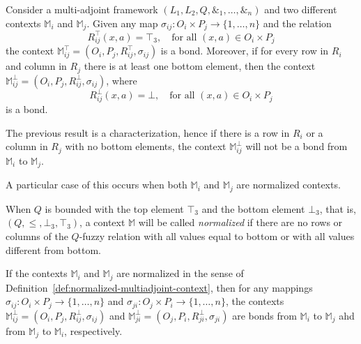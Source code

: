 \documentclass[runningheads,a4paper]{llncs}
\newcommand{\M}{\mathbb{M}}
\newcommand{\adjoint}{\mathop{\&}\nolimits}
\newcommand{\cb}[1]{{\color{blue}#1}}
\begin{document}
\begin{proposition}\label{prop:trivial-multiadjoint-bonds}
	
Consider a multi-adjoint framework $(L_1, L_2, Q, \adjoint_1, \dots, \adjoint_n)$ and two different contexts $\M_i$ and $\M_j$. Given any map $\sigma_{ij} \colon O_i \times P_j \to \{1, \dots, n\}$ and the relation
\[
R_{ij}^\top(x, a) = \top_3, \quad \text{for all $(x, a) \in O_i \times P_j$}
\]
the context $\M_{ij}^\top = (O_i, P_j, R_{ij}^\top, \sigma_{ij})$ is a bond. Moreover,
if for every row in $R_i$ and column in $R_j$ there is at least one bottom element,
then the context $\M_{ij}^\bot = (O_i, P_j, R_{ij}^\bot, \sigma_{ij})$, where
\[
R_{ij}^\bot(x, a) = \bot, \quad \text{for all $(x, a) \in O_i \times P_j$}
\]
is a bond.

\end{proposition}

\begin{remark}
	
The previous result is a characterization, hence if there is a row in $R_i$ or a column in $R_j$ with no bottom elements, the context $\M_{ij}^\bot$ will not be a bond from $\M_i$ to $\M_j$.

\end{remark}

A particular case of this occurs when both $\M_i$ and $\M_j$ are normalized contexts.

\cb{
\begin{definition}\label{def:normalized-multiadjoint-context}
When $Q$ is bounded with the top element $\top_3$ and the bottom element $\bot_3$, that is, $(Q,\leq,\bot_3,\top_3)$, a context $\M$ will be called \emph{normalized} if there are no rows or columns of the  $Q$-fuzzy relation with all values equal to bottom or with all values different from bottom.
\end{definition}
}

\begin{corollary}

If the contexts $\M_i$ and $\M_j$ are normalized in the sense of Definition~\ref{def:normalized-multiadjoint-context}, then for any mappings $\sigma_{ij} \colon O_i \times P_j \to \{1, \dots, n\}$ and $\sigma_{ji} \colon O_j \times P_i \to \{1, \dots, n\}$, the contexts $\M_{ij}^\bot = (O_i, P_j, R_{ij}^\bot, \sigma_{ij})$ and $\M_{ji}^\bot = (O_j, P_i, R_{ji}^\bot, \sigma_{ji})$ are bonds from $\M_i$ to $\M_j$ ahd from $\M_j$ to $\M_i$, respectively.

\end{corollary}
\end{document}
